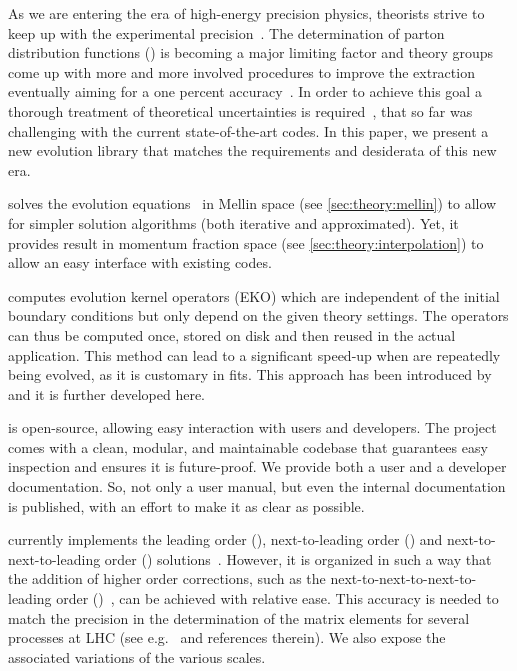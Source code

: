 
As we are entering the era of high-energy precision physics, theorists strive
to keep up with the experimental precision~\cite{Gao:2017yyd}.
The determination of parton distribution functions (\pdfs) is becoming
a major limiting factor and theory groups come up with more and more
involved procedures to improve the extraction~\cite{NNPDF:2017mvq,Hou:2019efy,Bailey:2020ooq}
eventually aiming for a one percent accuracy~\cite{NNPDF:2021njg}.
In order to achieve this goal a thorough treatment of theoretical
uncertainties is required~\cite{AbdulKhalek:2019ihb},
that so far was challenging with the current
state-of-the-art codes.
In this paper, we present \eko{} a new \qcd{} evolution library that matches
the requirements and desiderata of this new era.

\eko{} solves the evolution
equations~\cite{Altarelli:1977zs,Gribov:1972ri,Dokshitzer:1977sg} in Mellin
space (see \cref{sec:theory:mellin}) to allow for simpler solution algorithms
(both iterative and approximated).
Yet, it provides result in momentum fraction space (see
\cref{sec:theory:interpolation}) to allow an easy interface with existing
codes.

\eko{} computes evolution kernel operators (EKO) which are independent of
the initial boundary conditions but only depend on the given theory settings.
The operators can thus be computed once, stored on disk and then reused in the
actual application. This method can lead to a significant speed-up when \pdfs
are repeatedly being evolved, as it is customary in \pdf{} fits.
This approach has been introduced by \fk{}~\cite{Ball:2008by,Ball:2010de,DelDebbio:2007ee}
and it is further developed here.

\eko{} is open-source, allowing easy interaction with users
and developers.
The project comes with a clean, modular, and maintainable codebase that guarantees
easy inspection and ensures it is future-proof.
We provide both a user and a developer documentation. So, not only a user
manual, but even the internal documentation is published, with an effort to make
it as clear as possible.

\eko{} currently implements the leading order (\lo{}),
next-to-leading order (\nlo{}) and next-to-next-to-leading order (\nnlo{})
solutions~\cite{Vogt:2004mw,Moch:2004pa,Blumlein:2021enk}.
However, it is organized in such a way that the addition of higher order corrections,
such as the next-to-next-to-next-to-leading order (\nnnlo{})~\cite{Moch:2021qrk},
can be achieved with relative ease.
This accuracy is needed to match the precision in the determination of the
matrix elements for several processes at LHC (see e.g.\ \cite{Duhr:2021vwj} and
references therein).
We also expose the associated variations of the various scales.

